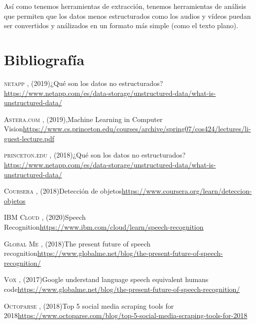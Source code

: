 \documentclass[twocolumn]{article}
\begin{document}
Así como tenemos herramientas de extracción, tenemos herramientas de análisis que permiten que los datos menos estructurados como los audios y vídeos puedan ser convertidos y análizados en un formato más simple (como el texto plano).

\section{Bibliografía}

\begin{thebibliography}{X}
  
  
   \textsc{netapp} ,
  \textit{}(2019)¿Qué son los datos no estructurados?\url{https://www.netapp.com/es/data-storage/unstructured-data/what-is-unstructured-data/}
  
   \textsc{Astera.com} ,
  \textit{}(2019),Machine Learning in Computer Vision\url{https://www.cs.princeton.edu/courses/archive/spring07/cos424/lectures/li-guest-lecture.pdf}


   \textsc{princeton.edu} ,
  \textit{}(2018)¿Qué son los datos no estructurados?\url{https://www.netapp.com/es/data-storage/unstructured-data/what-is-unstructured-data/}
  
   \textsc{Coursera} ,
  \textit{}(2018)Detección de objetos\url{https://www.coursera.org/learn/deteccion-objetos}

   \textsc{IBM Cloud} ,
  \textit{}(2020)Speech Recognition\url{https://www.ibm.com/cloud/learn/speech-recognition}

   \textsc{Global Me} ,
    \textit{}(2018)The present future of speech recognition\url{https://www.globalme.net/blog/the-present-future-of-speech-recognition/}
  
   \textsc{Vox} ,
    \textit{}(2017)Google understand language speech equivalent humans code\url{https://www.globalme.net/blog/the-present-future-of-speech-recognition/}
  
   \textsc{Octoparse} ,
    \textit{}(2018)Top 5 social media scraping tools for 2018\url{https://www.octoparse.com/blog/top-5-social-media-scraping-tools-for-2018}

\end{thebibliography}
\end{document}
